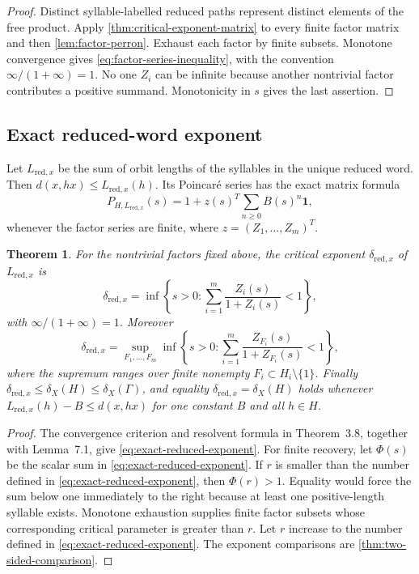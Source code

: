 \documentclass[11pt]{article}
\newtheorem{theorem}{Theorem}[section]
\theoremstyle{definition}
\newcommand{\red}{\mathrm{red}}
\newcommand{\one}{\mathbf 1}
\begin{document}
\begin{proof}
Distinct syllable-labelled reduced paths represent distinct elements of the free product.
Apply \cref{thm:critical-exponent-matrix} to every finite factor matrix and then
\cref{lem:factor-perron}.  Exhaust each factor by finite subsets.  Monotone convergence gives
\eqref{eq:factor-series-inequality}, with the convention $\infty/(1+\infty)=1$.  No one
$Z_i$ can be infinite because another nontrivial factor contributes a positive summand.
Monotonicity in $s$ gives the last assertion.
\end{proof}

\subsection{Exact reduced-word exponent}
Let $L_{\red,x}$ be the sum of orbit lengths of the syllables in the unique reduced word.
Then $d(x,hx)\le L_{\red,x}(h)$.  Its Poincar\'e series has the exact matrix formula
\begin{equation}\label{eq:free-product-resolvent}
 P_{H,L_{\red,x}}(s)
 =1+z(s)^T\sum_{n\ge0}B(s)^n\one,
\end{equation}
whenever the factor series are finite, where $z=(Z_1,\dots,Z_m)^T$.

\begin{theorem}
\label{thm:exact-reduced-exponent}
For the nontrivial factors fixed above, the critical exponent $\delta_{\red,x}$ of
$L_{\red,x}$ is
\begin{equation}\label{eq:exact-reduced-exponent}
 \delta_{\red,x}
 =\inf\left\{s>0:
 \sum_{i=1}^m\frac{Z_i(s)}{1+Z_i(s)}<1\right\},
\end{equation}
with $\infty/(1+\infty)=1$.  Moreover
\begin{equation}\label{eq:finite-factor-recovery}
 \delta_{\red,x}
 =\sup_{F_1,\dots,F_m}
 \inf\left\{s>0:
 \sum_{i=1}^m\frac{Z_{F_i}(s)}{1+Z_{F_i}(s)}<1\right\},
\end{equation}
where the supremum ranges over finite nonempty $F_i\subset H_i\setminus\{1\}$.
Finally $\delta_{\red,x}\le\delta_X(H)\le\delta_X(\Gamma)$, and equality
$\delta_{\red,x}=\delta_X(H)$ holds whenever
$L_{\red,x}(h)-B\le d(x,hx)$ for one constant $B$ and all $h\in H$.
\end{theorem}

\begin{proof}
The convergence criterion and resolvent formula in
Theorem~3.8, together with Lemma~7.1, give
\eqref{eq:exact-reduced-exponent}.  For finite recovery, let $\Phi(s)$ be the scalar sum in
\eqref{eq:exact-reduced-exponent}.  If $r$ is smaller than the number defined in \eqref{eq:exact-reduced-exponent}, then
$\Phi(r)>1$. Equality would force the sum below one immediately to the right because at
least one positive-length syllable exists.  Monotone exhaustion supplies finite factor subsets
whose corresponding critical parameter is greater than $r$.  Let $r$ increase to the number
defined in \eqref{eq:exact-reduced-exponent}.  The exponent comparisons are \cref{thm:two-sided-comparison}.
\end{proof}
\end{document}

